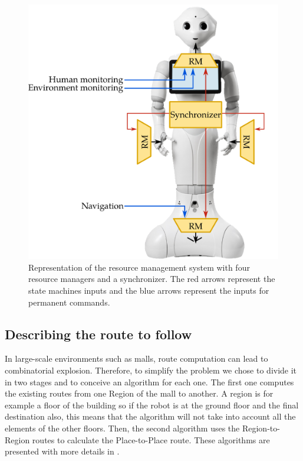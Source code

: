\documentclass[a4paper,11pt,twoside]{StyleThese}
\begin{document}
\begin{figure}[!hb]
	\centering
	\includegraphics[scale=0.26]{figures/chapter3/rm.png}
	\caption{\label{fig:chap3_rm} Representation of the resource management system with four resource managers and a synchronizer. The red arrows represent the state machines inputs and the blue arrows represent the inputs for permanent commands.}
\end{figure}

\subsection{Describing the route to follow}\label{subsec:route_description}

In large-scale environments such as malls, route computation can lead to combinatorial explosion. Therefore, to simplify the problem we chose to divide it in two stages and to conceive an algorithm for each one. The first one computes the existing routes from one Region of the mall to another. A region is for example a floor of the building so if the robot is at the ground floor and the final destination also, this means that the algorithm will not take into account all the elements of the other floors. Then, the second algorithm uses the Region-to-Region routes to calculate the Place-to-Place route. These algorithms are presented with more details in \cite{sarthou_2019_semantic}.
\end{document}
